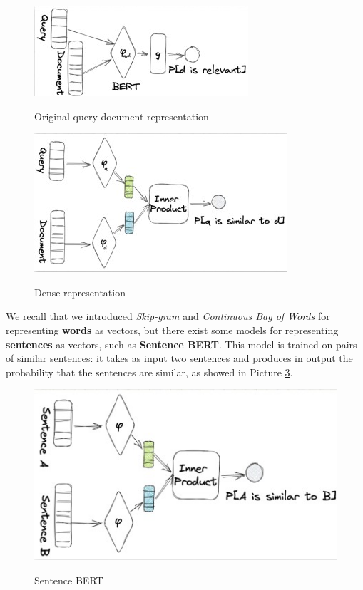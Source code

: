 \begin{figure}[h!]
		\centering
		\includegraphics[scale = 1.8]{img/dense 1.jpg}
        \label{dense 1}
        \caption{Original query-document representation}
\end{figure}

\begin{figure}[h!]
		\centering
		\includegraphics[scale = 1.8]{img/dense 2.jpg}
        \label{dense 2}
        \caption{Dense representation}
\end{figure}

We recall that we introduced \textit{Skip-gram} and \textit{Continuous Bag of Words} for representing \textbf{words} as vectors, but there exist some models for representing \textbf{sentences} as vectors, such as \textbf{Sentence BERT}. This model is trained on pairs of similar sentences: it takes as input two sentences and produces in output the probability that the sentences are similar, as showed in Picture \ref{sentence bert}.

\begin{figure}[h!]
		\centering
		\includegraphics[scale = 1.6]{img/sentence bert.jpg}
        \label{sentence bert}
        \caption{Sentence BERT}
\end{figure}

